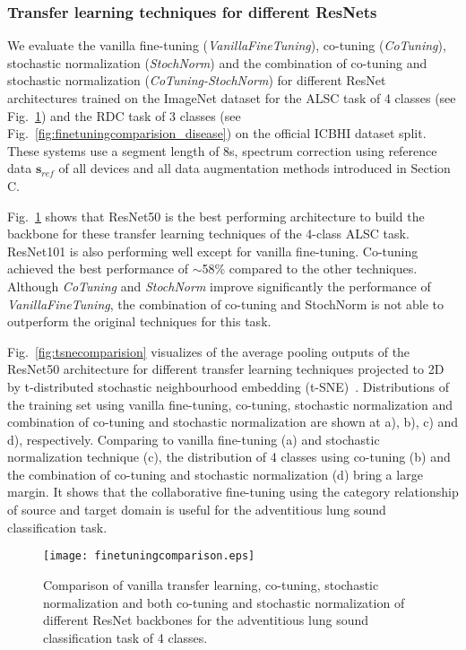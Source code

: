 \documentclass[journal]{IEEEtran}
\begin{document}
\subsubsection{Transfer learning techniques for different ResNets}
We evaluate the vanilla fine-tuning (\textit{VanillaFineTuning}), co-tuning (\textit{CoTuning}), stochastic normalization (\textit{StochNorm}) and the combination of co-tuning and stochastic normalization (\textit{CoTuning-StochNorm}) for different ResNet architectures trained on the ImageNet dataset for the ALSC task of 4 classes (see Fig.~\ref{fig:finetuningcomparision}) and the RDC task of 3 classes (see Fig.~\ref{fig:finetuningcomparision_disease}) on the official ICBHI dataset split. These systems use a segment length of 8s, spectrum correction using reference data $\boldsymbol{s}_{ref}$ of all devices and all data augmentation methods introduced in Section C. 

Fig.~\ref{fig:finetuningcomparision} shows that ResNet50 is the best performing architecture to build the backbone for these transfer learning techniques of the 4-class ALSC task. ResNet101 is also performing well except for vanilla fine-tuning. Co-tuning achieved the best performance of $\sim$58\% compared to the other techniques. Although \textit{CoTuning} and \textit{StochNorm} improve significantly the performance of \textit{VanillaFineTuning}, the combination of co-tuning and StochNorm is not able to outperform the original techniques for this task.  

Fig.~\ref{fig:tsnecomparision} visualizes of the average pooling outputs of the ResNet50 architecture for different transfer learning techniques projected to 2D by t-distributed stochastic neighbourhood embedding (t-SNE)~\cite{JMLR:v9:vandermaaten08a}. Distributions of the training set using vanilla fine-tuning, co-tuning, stochastic normalization and combination of co-tuning and stochastic normalization are shown at a), b), c) and d), respectively.  Comparing to vanilla fine-tuning (a) and stochastic normalization technique (c), the distribution of 4 classes using co-tuning (b) and the combination of co-tuning and stochastic normalization (d) bring a large margin. It shows that the collaborative fine-tuning using the category relationship of source and target domain is useful for the adventitious lung sound classification task.
\begin{figure}[t]
	\centering
    \texttt{[image: finetuningcomparison.eps]}
	\caption{Comparison of vanilla transfer learning, co-tuning, stochastic normalization and both co-tuning and stochastic normalization of different ResNet backbones for the adventitious lung sound classification task of 4 classes.}
	\label{fig:finetuningcomparision}
\end{figure}
\end{document}
